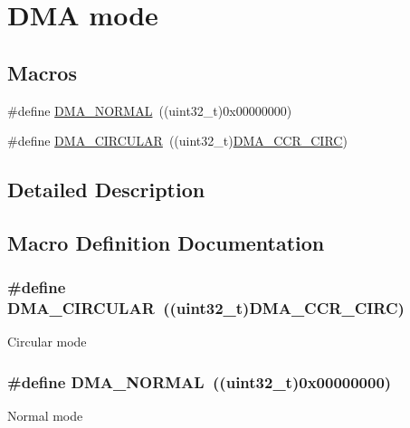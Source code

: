 \hypertarget{group___d_m_a__mode}{\section{D\-M\-A mode}
\label{group___d_m_a__mode}
}
\subsection*{Macros}
\begin{DoxyCompactItemize}
\item 
\#define \hyperlink{group___d_m_a__mode_ga04941acfbbdefc53e1e08133cffa3b8a}{D\-M\-A\-\_\-\-N\-O\-R\-M\-A\-L}~((uint32\-\_\-t)0x00000000)
\item 
\#define \hyperlink{group___d_m_a__mode_ga4c4f425cba13edffb3c831c036c91e01}{D\-M\-A\-\_\-\-C\-I\-R\-C\-U\-L\-A\-R}~((uint32\-\_\-t)\hyperlink{group___peripheral___registers___bits___definition_ga445471396e741418bcd6f63404f4052c}{D\-M\-A\-\_\-\-C\-C\-R\-\_\-\-C\-I\-R\-C})
\end{DoxyCompactItemize}


\subsection{Detailed Description}


\subsection{Macro Definition Documentation}
\hypertarget{group___d_m_a__mode_ga4c4f425cba13edffb3c831c036c91e01}{
\subsubsection[{D\-M\-A\-\_\-\-C\-I\-R\-C\-U\-L\-A\-R}]{\setlength{\rightskip}{0pt plus 5cm}\#define D\-M\-A\-\_\-\-C\-I\-R\-C\-U\-L\-A\-R~((uint32\-\_\-t){\bf D\-M\-A\-\_\-\-C\-C\-R\-\_\-\-C\-I\-R\-C})}}\label{group___d_m_a__mode_ga4c4f425cba13edffb3c831c036c91e01}
Circular mode \hypertarget{group___d_m_a__mode_ga04941acfbbdefc53e1e08133cffa3b8a}{
\subsubsection[{D\-M\-A\-\_\-\-N\-O\-R\-M\-A\-L}]{\setlength{\rightskip}{0pt plus 5cm}\#define D\-M\-A\-\_\-\-N\-O\-R\-M\-A\-L~((uint32\-\_\-t)0x00000000)}}\label{group___d_m_a__mode_ga04941acfbbdefc53e1e08133cffa3b8a}
Normal mode 
